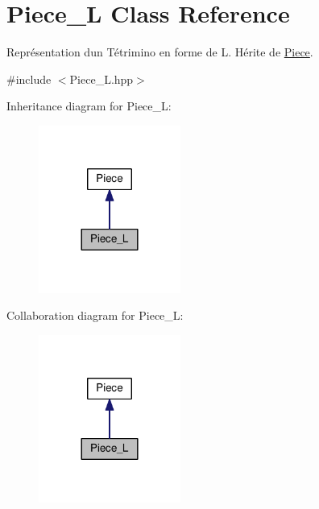 \hypertarget{classPiece__L}{}\section{Piece\+\_\+L Class Reference}
\label{classPiece__L}


Représentation d\textquotesingle{}un Tétrimino en forme de L. Hérite de \hyperlink{classPiece}{Piece}.  




{\ttfamily \#include $<$Piece\+\_\+\+L.\+hpp$>$}



Inheritance diagram for Piece\+\_\+L\+:
\nopagebreak
\begin{figure}[H]
\begin{center}
\leavevmode
\includegraphics[width=132pt]{classPiece__L__inherit__graph}
\end{center}
\end{figure}


Collaboration diagram for Piece\+\_\+L\+:
\nopagebreak
\begin{figure}[H]
\begin{center}
\leavevmode
\includegraphics[width=132pt]{classPiece__L__coll__graph}
\end{center}
\end{figure}
